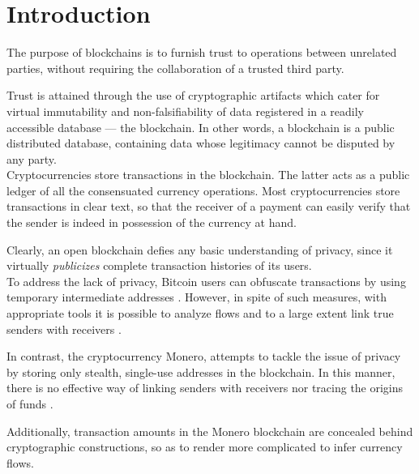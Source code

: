 

\chapter{Introduction}
\label{chap:introduction}

The purpose of blockchains is to furnish trust to operations between unrelated parties, without requiring the collaboration of a trusted third party.

Trust is attained through the use of cryptographic artifacts which cater for virtual immutability and non-falsifiability of data registered in a readily accessible database --- the blockchain.
In other words, a blockchain is a public distributed database, containing data whose legitimacy cannot 
be disputed by any party.
\\

Cryptocurrencies store transactions in the blockchain. The latter acts as a public ledger of all the consensuated currency operations. Most cryptocurrencies store transactions in clear text, so that
the receiver of a payment can easily verify that the sender is indeed in possession of the currency at hand.

Clearly, an open blockchain defies any basic understanding of privacy, since it virtually 
{\em publicizes} complete transaction histories of its users. 
\\

To address the lack of privacy, Bitcoin users can obfuscate transactions by using temporary intermediate addresses \cite{DBLP:journals/corr/NarayananM17}. However, in spite of such measures, with appropriate tools it is possible to analyze flows and to a large extent 
link true senders with receivers \cite{DBLP:journals/corr/ShenTuY15b, DK-police-tracing-btc, Andrew-Cox-Sandia}.

In contrast, the cryptocurrency Monero, attempts to tackle the issue of privacy by storing only stealth, single-use addresses in the blockchain. In this manner, there is no effective way of linking senders with receivers nor tracing the origins of funds \cite{Monero-intro}.

Additionally, transaction amounts in the Monero blockchain are concealed behind cryptographic constructions, so as to render more complicated to infer currency flows.

